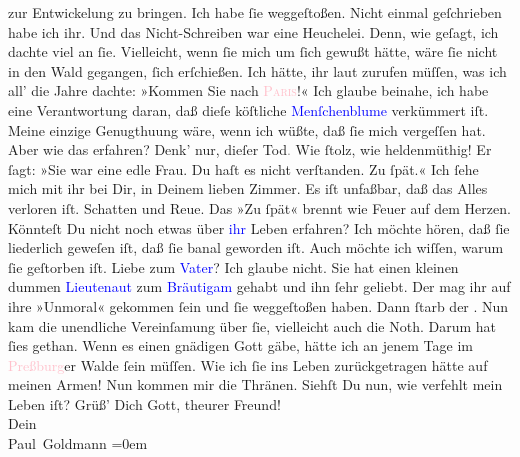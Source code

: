                zur Entwickelung zu bringen. Ich habe ſie weggeſtoßen. Nicht einmal geſchrieben habe
               ich ihr. Und das Nicht-Schreiben war eine Heuchelei. Denn, wie geſagt, ich dachte
               viel an ſie. Vielleicht, wenn ſie mich um ſich gewußt hätte, wäre ſie nicht in den
               Wald {\pb}gegangen, ſich erſchießen. Ich hätte, ihr laut
               zurufen müſſen, was ich all’ die Jahre dachte: »Kommen Sie nach \textsc{\textcolor{pink}{Paris}{}\ledrightnote{\textcolor{pink}{Paris}}}!« Ich glaube beinahe, ich habe eine Verantwortung daran, daß dieſe köſtliche
                  \textcolor{blue}{Menſchenblume}{} verkümmert
               iſt. Meine einzige Genugthuung wäre, wenn ich wüßte, daß ſie mich vergeſſen hat. Aber
               wie das erfahren?\pend
           \pstart
           Denk’ nur, dieſer Tod\textcolor{gray}{.} Wie ſtolz, wie heldenmüthig! Er ſagt: »Sie
               war eine edle Frau. Du haſt es nicht verſtanden. Zu ſpät.«\pend
           \pstart
           Ich ſehe mich mit ihr bei Dir, in Deinem lieben {\pb}Zimmer. Es iſt unfaßbar, daß das Alles verloren iſt. Schatten und Reue. Das »Zu
               ſpät« brennt wie Feuer auf dem Herzen.\pend
           \pstart
           Könnteſt Du nicht noch etwas über \textcolor{blue}{ihr}{} Leben erfahren? Ich möchte hören, daß ſie liederlich geweſen iſt, daß
               ſie banal geworden iſt. Auch möchte ich wiſſen, \strikeout{\textcolor{gray}{×}} warum ſie geſtorben iſt. Liebe zum \textcolor{blue}{Vater}{}? Ich glaube nicht. Sie hat einen kleinen dummen \textcolor{blue}{Lieutenaut}{} zum \textcolor{blue}{Bräutigam}{} gehabt und ihn ſehr
               geliebt. Der mag ihr auf ihre »Unmoral« gekommen ſein und ſie weggeſtoßen {\pb}haben. Dann ſtarb der \label{K_L02628-2v}\label{K_L02628-2h}.
               Nun kam die unendliche Vereinſamung über ſie, vielleicht auch die Noth. Darum hat
               ſies gethan.\pend
           \pstart
           Wenn es einen gnädigen Gott gäbe, hätte ich an jenem Tage im \textcolor{pink}{Preßburg}{}\ledrightnote{\textcolor{pink}{Bratislava}}er Walde ſein müſſen. Wie ich ſie ins Leben
               zurückgetragen hätte auf meinen Armen!\pend
           \pstart
           Nun kommen mir die Thränen.\pend
           \pstart
           Siehſt Du nun, wie verfehlt mein Leben iſt?\pend
           \pstart
           Grüß’ Dich Gott, theurer Freund!{\\[\baselineskip]}Dein{\\[\baselineskip]}\spacefill\mbox{Paul Goldmann}\pend
           \leftskip=0em{}\endnumbering{}  
      